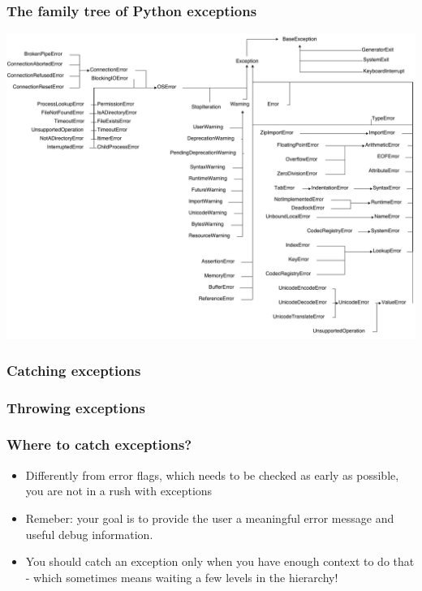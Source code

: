 \documentclass[9pt]{beamer}
\begin{document}
\begin{frame}
  \frametitle{The family tree of Python exceptions}
  \centering\includegraphics[height=0.8\textheight]{python_exceptions}
\end{frame}


\begin{frame}
  \frametitle{Catching exceptions}
  
\end{frame}


\begin{frame}
  \frametitle{Throwing exceptions}
  
\end{frame}


\begin{frame}
  \frametitle{Where to catch exceptions?}

  \begin{itemize}
    \item Differently from error flags, which needs to be checked as early as
          possible, you are not in a rush with exceptions
    \item Remeber: your goal is to provide the user a meaningful error message and
          useful debug information.
    \item You should catch an exception only when you have enough context to
          do that - which sometimes means waiting a few levels in the hierarchy!
  \end{itemize}
\end{frame}
\end{document}
